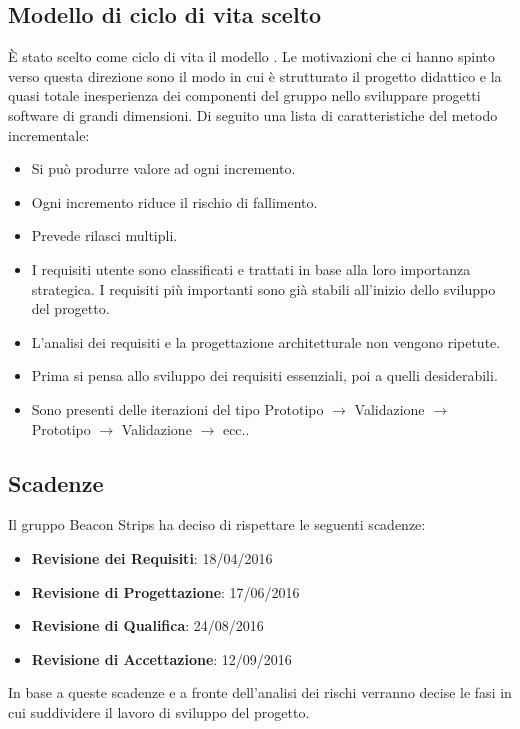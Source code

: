 	\subsection{Modello di ciclo di vita scelto}
	È stato scelto come ciclo di vita il modello . Le motivazioni che ci hanno spinto verso questa direzione sono il modo in cui è strutturato il progetto didattico e la quasi totale inesperienza dei componenti del gruppo nello sviluppare progetti software di grandi dimensioni. Di seguito una lista di caratteristiche del metodo incrementale:
	\begin{itemize}
		\item Si può produrre valore ad ogni incremento.
		\item Ogni incremento riduce il rischio di fallimento.
		\item Prevede rilasci multipli.
		\item I requisiti utente sono classificati e trattati in base alla loro importanza strategica. I requisiti più importanti sono già stabili all'inizio dello sviluppo del progetto.
		\item L'analisi dei requisiti e la progettazione architetturale non vengono ripetute.
		\item Prima si pensa allo sviluppo dei requisiti essenziali, poi a quelli desiderabili.
		\item Sono presenti delle iterazioni del tipo Prototipo $\rightarrow$ Validazione $\rightarrow$ Prototipo $\rightarrow$ Validazione $\rightarrow$ ecc..
	\end{itemize}
	\subsection{Scadenze}
	Il gruppo Beacon Strips ha deciso di rispettare le seguenti scadenze:
	\begin{itemize}
		\item \textbf{Revisione dei Requisiti}: 18/04/2016
		\item \textbf{Revisione di Progettazione}: 17/06/2016
		\item \textbf{Revisione di Qualifica}: 24/08/2016
		\item \textbf{Revisione di Accettazione}: 12/09/2016
	\end{itemize}
	In base a queste scadenze e a fronte dell'analisi dei rischi verranno decise le fasi in cui suddividere il lavoro di sviluppo del progetto.
	
	
